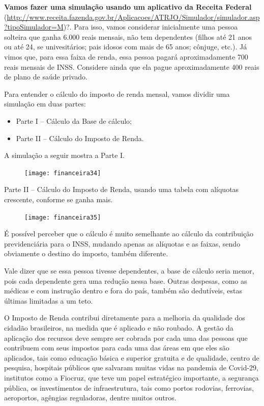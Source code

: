 \textbf{Vamos fazer uma simulação usando um aplicativo da Receita Federal} (\url{http://www.receita.fazenda.gov.br/Aplicacoes/ATRJO/Simulador/simulador.asp?tipoSimulador=M})?. Para isso, vamos considerar inicialmente uma pessoa solteira que ganha 6.000 reais mensais, não tem dependentes (filhos até 21 anos ou até 24, se univesitários; pais idosos com mais de 65 anos; cônjuge, etc.). Já vimos que, para essa faixa de renda, essa pessoa pagará aproximadamente 700 reais mensais de INSS. Considere ainda que ela pague aproximadamente 400 reais de plano de saúde privado.

Para entender o cálculo do imposto de renda mensal, vamos dividir uma simulação em duas partes:

\begin{itemize}
  \item Parte I -- Cálculo da Base de cálculo;
  \item Parte II -- Cálculo do Imposto de Renda.
\end{itemize}

A simulação a seguir mostra a Parte I.

\begin{figure}[H]
\centering

\texttt{[image: financeira34]}
\end{figure}

Parte II -- Cálculo do Imposto de Renda, usando uma tabela com alíquotas crescente, conforme se ganha mais.

\begin{figure}[H]
\centering

\texttt{[image: financeira35]}
\end{figure}

É possível perceber que o cálculo é muito semelhante ao cálculo da contribuição previdenciária para o INSS, mudando apenas as alíquotas e as faixas, sendo obviamente o destino do imposto, também diferente.

Vale dizer que se essa pessoa tivesse dependentes, a base de cálculo seria menor, pois cada dependente gera uma redução nessa base. Outras despesas, como as médicas e com instrução dentro e fora do país, também são dedutíveis, estas últimas limitadas a um teto.

O Imposto de Renda contribui diretamente para a melhoria da qualidade dos cidadão brasileiros, na medida que é aplicado e não roubado. A gestão da aplicação dos recursos deve sempre ser cobrada por cada uma das pessoas que contribuem com seus impostos para cada uma das áreas em que eles são aplicados, tais como educação básica e superior gratuita e de qualidade, centro de pesquisa, hospitais públicos que salvaram muitas vidas na pandemia de Covid-29, institutos como a Fiocruz, que teve um papel estratégico importante, a segurança pública, os investimentos de infraestrutura, tais como portos rodovias, ferrovias, aeroportos, agêngias reguladoras, dentre muitos outros.

